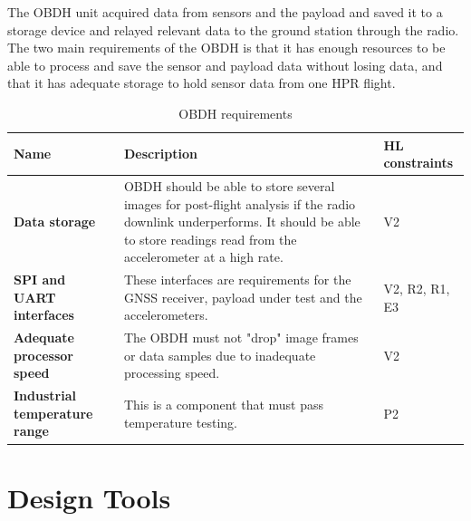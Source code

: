 \documentclass{report}
\begin{document}
The OBDH unit acquired data from sensors and the payload and saved it to a storage device and relayed relevant data to the ground station through the radio. The two main requirements of the OBDH is that it has enough resources to be able to process and save the sensor and payload data without losing data, and that it has adequate storage to hold sensor data from one HPR flight.

\begin{table}[H]
  \centering
  \begin{tabular}{|L{0.2\textwidth}|L{0.495\textwidth}|L{0.2\textwidth}|}
    \hline
    \textbf{Name}                         & \textbf{Description}                                                                                                                                                                      & \textbf{HL constraints} \\ \hline
    \textbf{Data storage}                 & OBDH should be able to store several images for post-flight analysis if the radio downlink underperforms. It should be able to store readings read from the accelerometer at a high rate. & V2                      \\\hline
    \textbf{SPI and UART interfaces}      & These interfaces are requirements for the GNSS receiver, payload under test and the accelerometers.                                                                                       & V2, R2, R1, E3          \\\hline
    \textbf{Adequate processor speed}     & The OBDH must not "drop" image frames or data samples due to inadequate processing speed.                                                                                                 & V2                      \\\hline
    \textbf{Industrial temperature range} & This is a component that must pass temperature testing.                                                                                                                                   & P2                      \\\hline
  \end{tabular}
  \caption{OBDH requirements}
  \label{tabl:obdh-requirements}
\end{table}


\section{Design Tools}
\label{sec:design-tools}
\end{document}
